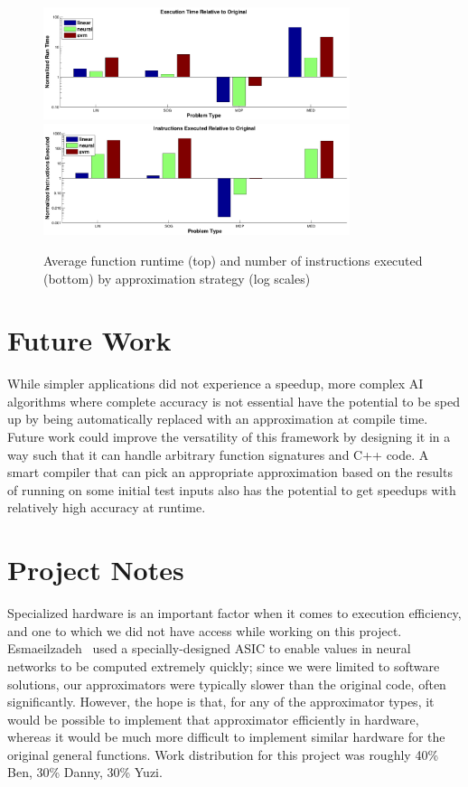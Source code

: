 \documentclass{article}
\begin{document}
\begin{figure}
  \centering
  \includegraphics[width=0.8\textwidth]{images/results_run_time_noorig}
  \includegraphics[width=0.8\textwidth]{images/results_instructions_noorig}
  \caption{Average function runtime (top) and number of instructions executed (bottom) by approximation strategy (log scales)}
  \label{fig:results_run_time}
\end{figure}

\section{Future Work}

While simpler applications did not experience a speedup, more complex AI algorithms where complete accuracy is not essential have the potential to be sped up by being automatically replaced with an approximation at compile time. Future work could improve the versatility of this framework by designing it in a way such that it can handle arbitrary function signatures and C++ code. A smart compiler that can pick an appropriate approximation based on the results of running on some initial test inputs also has the potential to get speedups with relatively high accuracy at runtime.

\section{Project Notes}
\label{sec:project_notes}

Specialized hardware is an important factor when it comes to execution efficiency, and one to which we did not have access while working on this project. Esmaeilzadeh~\cite{Esmaeilzadeh12} used a specially-designed ASIC to enable values in neural networks to be computed extremely quickly; since we were limited to software solutions, our approximators were typically slower than the original code, often significantly. However, the hope is that, for any of the approximator types, it would be possible to implement that approximator efficiently in hardware, whereas it would be much more difficult to implement similar hardware for the original general functions. Work distribution for this project was roughly 40\% Ben, 30\% Danny, 30\% Yuzi.



\end{document}
